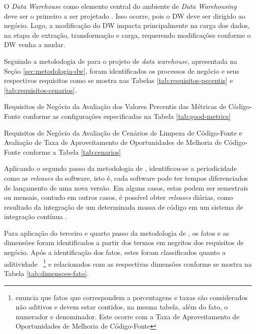 O \textit{Data Warehouse} como elemento central do ambiente de \textit{Data Warehousing} deve ser o primeiro a ser projetado \cite{Kimball2002}. Isso ocorre, pois o DW deve ser dirigido ao negócio. Logo, a modificação do DW impacta principalmente na carga dos dados, na etapa de extração, transformação e carga, requerendo modificações conforme o DW venha a mudar.

Seguindo a metolodogia de  para o projeto de \textit{data warehouse}, apresentada na Seção \ref{sec:metodologia-dw}, foram identificados os processos de negócio e seus respectivos requisitos como se mostra nas Tabelas \ref{tab:requisitos-pecentis} e \ref{tab:requisitos-cenarios}. 


\begin{table}[H]
\centering

\caption{Requisitos de Negócio da Avaliação dos Valores Percentis das Métricas de Código-Fonte conforme as configurações especificadas na Tabela \ref{tab:good-metrics}}
\label{tab:requisitos-pecentis}
\end{table}
\FloatBarrier


\begin{table}[H]
\centering

\caption{Requisitos de Negócio da Avaliação de Cenários de Limpeza de Código-Fonte e Avaliação de Taxa de Aproveitamento de Oportunidades de Melhoria de Código-Fonte conforme a Tabela \ref{tab:cenarios}}
\label{tab:requisitos-cenarios}
\end{table}
\FloatBarrier


Aplicando o segundo passo da metodologia de , identificou-se a periodicidade como as \textit{releases} do software, isto é, cada software pode ter tempos diferenciados de lançamento de uma nova versão. Em alguns casos, estas podem ser semestrais ou mensais, contudo em outros casos, é possível obter \textit{releases} diárias, como resultado da integração de um determinada massa de código em um sistema de integração contínua \cite{beckarticle1999}. 

Para aplicação do terceiro e quarto passo da metodologia de , os fatos e as dimensões foram identificados a partir dos termos em negritos dos requisitos de negócio. Após a identificação dos fatos, estes foram classificados quanto a aditividade~
\footnote{ enuncia que fatos que correspondem a porcentagens e taxas são considerados não aditivos e devem estar contidos, na mesma tabela, além do fato, o numerador e denominador. Este ocorre com a Taxa de Aproveitamento de Oportunidades de Melhoria de Código-Fonte} e relacionados com as respectivas dimensões conforme se mostra na Tabela \ref{tab:dimensoes-fato}.


